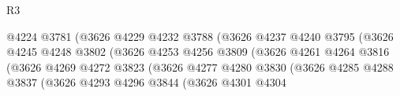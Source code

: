 \begin{lexlean}{R3}
\begin{coremodule}
                                                @4224
                                                @3781
                                                (@3626
                                                  @4229
                                                  @4232
                                                  @3788
                                                  (@3626
                                                    @4237
                                                    @4240
                                                    @3795
                                                    (@3626
                                                      @4245
                                                      @4248
                                                      @3802
                                                      (@3626
                                                        @4253
                                                        @4256
                                                        @3809
                                                        (@3626
                                                          @4261
                                                          @4264
                                                          @3816
                                                          (@3626
                                                            @4269
                                                            @4272
                                                            @3823
                                                            (@3626
                                                              @4277
                                                              @4280
                                                              @3830
                                                              (@3626
                                                                @4285
                                                                @4288
                                                                @3837
                                                                (@3626
                                                                  @4293
                                                                  @4296
                                                                  @3844
                                                                  (@3626
                                                                    @4301
                                                                    @4304

\end{coremodule}
\end{lexlean}
